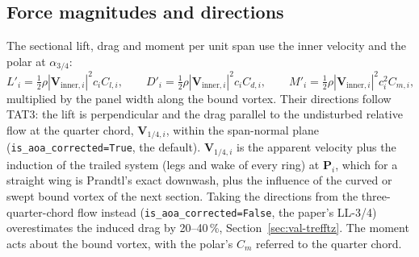 \documentclass[11pt,a4paper]{article}
\newcommand{\vect}[1]{\mathbf{#1}}
\newcommand{\code}[1]{\texttt{#1}}
\begin{document}
\subsection{Force magnitudes and directions}
\label{sec:forces}
The sectional lift, drag and moment per unit span use the inner velocity and the polar at $\alpha_{3/4}$:
\begin{equation}
L'_i=\tfrac12\rho|\vect V_{\mathrm{inner},i}|^2 c_i C_{l,i},\qquad D'_i=\tfrac12\rho|\vect V_{\mathrm{inner},i}|^2 c_i C_{d,i},\qquad M'_i=\tfrac12\rho|\vect V_{\mathrm{inner},i}|^2 c_i^2 C_{m,i},
\end{equation}
multiplied by the panel width along the bound vortex. Their directions follow TAT3: the lift is perpendicular and the drag parallel to the undisturbed relative flow at the quarter chord, $\vect V_{1/4,i}$, within the span-normal plane (\code{is\_aoa\_corrected=True}, the default). $\vect V_{1/4,i}$ is the apparent velocity plus the induction of the trailed system (legs and wake of every ring) at $\vect P_i$, which for a straight wing is Prandtl's exact downwash, plus the influence of the curved or swept bound vortex of the next section. Taking the directions from the three-quarter-chord flow instead (\code{is\_aoa\_corrected=False}, the paper's LL-3/4) overestimates the induced drag by 20--40\,\%, Section~\ref{sec:val-trefftz}. The moment acts about the bound vortex, with the polar's $C_m$ referred to the quarter chord.
\end{document}
